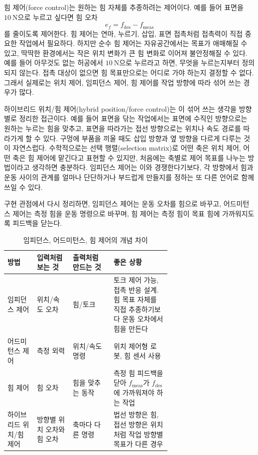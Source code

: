 힘 제어(force control)는 원하는 힘 자체를 추종하려는 제어이다.
예를 들어 표면을 $10~\mathrm{N}$으로 누르고 싶다면 힘 오차
\begin{equation}
  e_f=f_{\mathrm{des}}-f_{\mathrm{meas}}
\end{equation}
를 줄이도록 제어한다.
힘 제어는 연마, 누르기, 삽입, 표면 접촉처럼 접촉력이 직접 중요한 작업에서 필요하다.
하지만 순수 힘 제어는 자유공간에서는 목표가 애매해질 수 있고, 딱딱한 환경에서는 작은 위치 변화가 큰 힘 변화로 이어져 불안정해질 수 있다.
예를 들어 아무것도 없는 허공에서 $10~\mathrm{N}$으로 누르라고 하면, 무엇을 누르는지부터 정의되지 않는다.
접촉 대상이 없으면 힘 목표만으로는 어디로 가야 하는지 결정할 수 없다.
그래서 실제로는 위치 제어, 임피던스 제어, 힘 제어를 작업 방향에 따라 섞어 쓰는 경우가 많다.

하이브리드 위치/힘 제어(hybrid position/force control)는 이 섞어 쓰는 생각을 방향별로 정리한 접근이다.
예를 들어 표면을 닦는 작업에서는 표면에 수직인 방향으로는 원하는 누르는 힘을 맞추고, 표면을 따라가는 접선 방향으로는 위치나 속도 경로를 따라가게 할 수 있다.
구멍에 부품을 끼울 때도 삽입 방향과 옆 방향을 다르게 다루는 것이 자연스럽다.
수학적으로는 선택 행렬(selection matrix)로 어떤 축은 위치 제어, 어떤 축은 힘 제어에 맡긴다고 표현할 수 있지만, 처음에는 축별로 제어 목표를 나누는 방법이라고 생각하면 충분하다.
임피던스 제어는 이와 경쟁한다기보다, 각 방향에서 힘과 운동 사이의 관계를 얼마나 단단하거나 부드럽게 만들지를 정하는 또 다른 언어로 함께 쓰일 수 있다.

구현 관점에서 다시 정리하면, 임피던스 제어는 운동 오차를 힘으로 바꾸고, 어드미턴스 제어는 측정 힘을 운동 명령으로 바꾸며, 힘 제어는 측정 힘이 목표 힘에 가까워지도록 피드백을 닫는다.

\begin{table}[!htbp]
  \centering
  \caption{임피던스, 어드미턴스, 힘 제어의 개념 차이}
  \small
  \setlength{\tabcolsep}{4pt}
  \begin{tabularx}{\linewidth}{@{}>{\raggedright\arraybackslash}p{0.18\linewidth}>{\raggedright\arraybackslash}p{0.22\linewidth}>{\raggedright\arraybackslash}p{0.25\linewidth}>{\raggedright\arraybackslash}X@{}}
    \toprule
    방법 & 입력처럼 보는 것 & 출력처럼 만드는 것 & 좋은 상황 \\
    \midrule
    임피던스 제어 & 위치/속도 오차 & 힘/토크 & 토크 제어 가능, 접촉 반응 설계. 힘 목표 자체를 직접 추종하기보다 운동 오차에서 힘을 만든다 \\
    어드미턴스 제어 & 측정 외력 & 위치/속도 명령 & 위치 제어형 로봇, 힘 센서 사용 \\
    힘 제어 & 힘 오차 & 힘을 맞추는 동작 & 측정 힘 피드백을 닫아 $f_{\mathrm{meas}}$가 $f_{\mathrm{des}}$에 가까워져야 하는 작업 \\
    하이브리드 위치/힘 제어 & 방향별 위치 오차와 힘 오차 & 축마다 다른 명령 & 법선 방향은 힘, 접선 방향은 위치처럼 작업 방향별 목표가 다른 경우 \\
    \bottomrule
  \end{tabularx}
\end{table}

